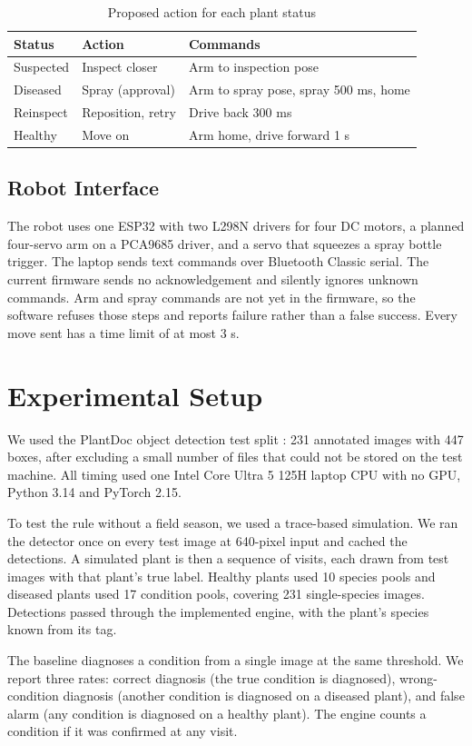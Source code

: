 \documentclass[conference]{IEEEtran}
\begin{document}
\begin{table}[t]
\centering
\caption{Proposed action for each plant status}
\footnotesize
\begin{tabular}{lll}
\toprule
Status & Action & Commands \\
\midrule
Suspected & Inspect closer & Arm to inspection pose \\
Diseased & Spray (approval) & Arm to spray pose, spray 500 ms, home \\
Reinspect & Reposition, retry & Drive back 300 ms \\
Healthy & Move on & Arm home, drive forward 1 s \\
\bottomrule
\end{tabular}
\end{table}
\subsection{Robot Interface}
The robot uses one ESP32 with two L298N drivers for four DC motors, a planned four-servo arm on a PCA9685 driver, and a servo that squeezes a spray bottle trigger. The laptop sends text commands over Bluetooth Classic serial. The current firmware sends no acknowledgement and silently ignores unknown commands. Arm and spray commands are not yet in the firmware, so the software refuses those steps and reports failure rather than a false success. Every move sent has a time limit of at most 3 s.

\section{Experimental Setup}
We used the PlantDoc object detection test split \cite{plantdoc}: 231 annotated images with 447 boxes, after excluding a small number of files that could not be stored on the test machine. All timing used one Intel Core Ultra 5 125H laptop CPU with no GPU, Python 3.14 and PyTorch 2.15.

To test the rule without a field season, we used a trace-based simulation. We ran the detector once on every test image at 640-pixel input and cached the detections. A simulated plant is then a sequence of visits, each drawn from test images with that plant's true label. Healthy plants used 10 species pools and diseased plants used 17 condition pools, covering 231 single-species images. Detections passed through the implemented engine, with the plant's species known from its tag.

The baseline diagnoses a condition from a single image at the same threshold. We report three rates: correct diagnosis (the true condition is diagnosed), wrong-condition diagnosis (another condition is diagnosed on a diseased plant), and false alarm (any condition is diagnosed on a healthy plant). The engine counts a condition if it was confirmed at any visit.
\end{document}
